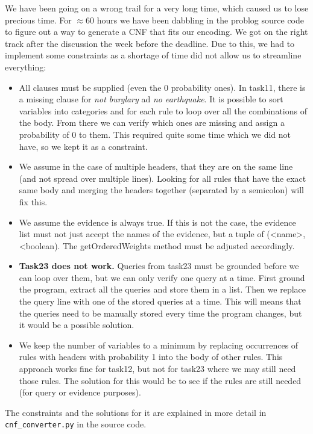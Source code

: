 We have been going on a wrong trail for a very long time, which caused us to lose precious time.  For $\approx$60 hours we have been dabbling in the problog source code to figure out a way to generate a CNF that fits our encoding. We got on the right track after the discussion the week before the deadline. Due to this, we had to implement some constraints as a shortage of time did not allow us to streamline everything:
\begin{itemize}
\item All clauses must be supplied (even the 0 probability ones). In task11, there is a missing clause for \textit{not burglary} ad \textit{no earthquake}. It is possible to sort variables into categories and for each rule to loop over all the combinations of the body. From there we can verify which ones are missing and assign a probability of 0 to them. This required quite some time which we did not have, so we kept it as a constraint.
\item We assume in the case of multiple headers, that they are on the same line (and not spread over multiple lines). Looking for all rules that have the exact same body and merging the headers together (separated by a semicolon) will fix this.
\item We assume the evidence is always true. If this is not the case, the evidence list must not just accept the names of the evidence, but a tuple of (<name>,<boolean). The getOrderedWeights method must be adjusted accordingly.
\item \textbf{Task23 does not work.}  Queries from task23 must be grounded before we can loop over them, but we can only verify one query at a time.  First ground the program, extract all the queries and store them in a list. Then we replace the query line with one of the stored queries at a time. This will means that the queries need to be manually stored every time the program changes, but it would be a possible solution.
\item We keep the number of variables to a minimum by replacing occurrences of rules with headers with probability 1 into the body of other rules. This approach works fine for task12, but not for task23 where we may still need those rules. The solution for this would be to see if the rules are still needed (for query or evidence purposes). 
\end{itemize}

The constraints and the solutions for it are explained in more detail in \texttt{cnf\_converter.py} in the source code.


